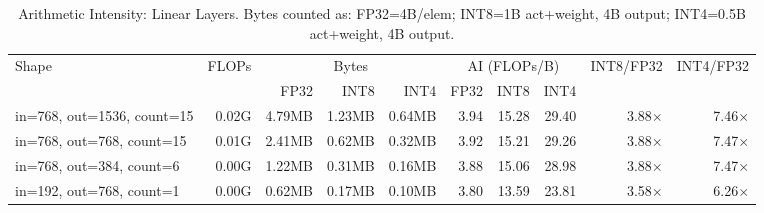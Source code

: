 \begin{table}[h]
  \centering
  \caption{Arithmetic Intensity: Linear Layers. Bytes counted as: FP32=4B/elem; INT8=1B act+weight, 4B output; INT4=0.5B act+weight, 4B output.}
  \label{tab:ai_linear}
  \begin{tabular}{lrrrrrrrrr}
    \toprule
    Shape & FLOPs & \multicolumn{3}{c}{Bytes} & \multicolumn{3}{c}{AI (FLOPs/B)} & INT8/FP32 & INT4/FP32 \\
    \cmidrule(lr){3-5}\cmidrule(lr){6-8}
    & & FP32 & INT8 & INT4 & FP32 & INT8 & INT4 & & \\
    \midrule
    in=768, out=1536, count=15 & 0.02G & 4.79MB & 1.23MB & 0.64MB & 3.94 & 15.28 & 29.40 & 3.88$\times$ & 7.46$\times$ \\
    in=768, out=768, count=15 & 0.01G & 2.41MB & 0.62MB & 0.32MB & 3.92 & 15.21 & 29.26 & 3.88$\times$ & 7.47$\times$ \\
    in=768, out=384, count=6 & 0.00G & 1.22MB & 0.31MB & 0.16MB & 3.88 & 15.06 & 28.98 & 3.88$\times$ & 7.47$\times$ \\
    in=192, out=768, count=1 & 0.00G & 0.62MB & 0.17MB & 0.10MB & 3.80 & 13.59 & 23.81 & 3.58$\times$ & 6.26$\times$ \\
    \bottomrule
  \end{tabular}
\end{table}

